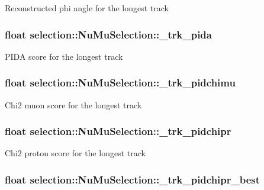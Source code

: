 Reconstructed phi angle for the longest track \hypertarget{classselection_1_1NuMuSelection_ae2b400954b0bce9930437be4fdb7fd85}{
\subsubsection[{\-\_\-trk\-\_\-pida}]{\setlength{\rightskip}{0pt plus 5cm}float selection\-::\-Nu\-Mu\-Selection\-::\-\_\-trk\-\_\-pida\hspace{0.3cm}{\ttfamily [private]}}}\label{classselection_1_1NuMuSelection_ae2b400954b0bce9930437be4fdb7fd85}
P\-I\-D\-A score for the longest track \hypertarget{classselection_1_1NuMuSelection_a3ae2c291adeedd490d43b915257553f7}{
\subsubsection[{\-\_\-trk\-\_\-pidchimu}]{\setlength{\rightskip}{0pt plus 5cm}float selection\-::\-Nu\-Mu\-Selection\-::\-\_\-trk\-\_\-pidchimu\hspace{0.3cm}{\ttfamily [private]}}}\label{classselection_1_1NuMuSelection_a3ae2c291adeedd490d43b915257553f7}
Chi2 muon score for the longest track \hypertarget{classselection_1_1NuMuSelection_af65eea94c4d2811de82693751684131d}{
\subsubsection[{\-\_\-trk\-\_\-pidchipr}]{\setlength{\rightskip}{0pt plus 5cm}float selection\-::\-Nu\-Mu\-Selection\-::\-\_\-trk\-\_\-pidchipr\hspace{0.3cm}{\ttfamily [private]}}}\label{classselection_1_1NuMuSelection_af65eea94c4d2811de82693751684131d}
Chi2 proton score for the longest track \hypertarget{classselection_1_1NuMuSelection_ad0b2f58434040e2c9e9304a93252d5e1}{
\subsubsection[{\-\_\-trk\-\_\-pidchipr\-\_\-best}]{\setlength{\rightskip}{0pt plus 5cm}float selection\-::\-Nu\-Mu\-Selection\-::\-\_\-trk\-\_\-pidchipr\-\_\-best\hspace{0.3cm}{\ttfamily [private]}}}\label{classselection_1_1NuMuSelection_ad0b2f58434040e2c9e9304a93252d5e1}
